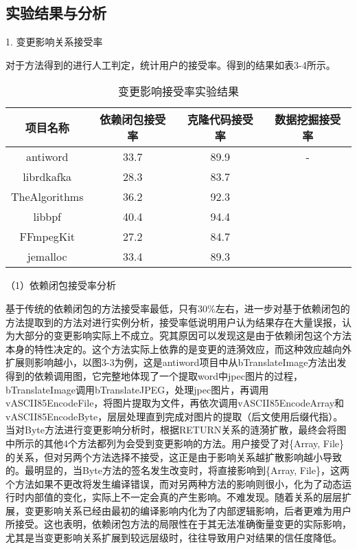 \subsection{实验结果与分析}


1. 变更影响关系接受率

对于方法得到的进行人工判定，统计用户的接受率。得到的结果如表3-4所示。

\begin{table}[htbp]
\caption{变更影响接受率实验结果}
\vspace{0.5em}\centering\wuhao
\begin{tabular}{cccc}
\toprule
项目名称 & 依赖闭包接受率 & 克隆代码接受率 & 数据挖掘接受率 \\
\midrule
antiword & 33.7 & 89.9 & - \\
librdkafka & 28.3 & 83.7 &  \\
TheAlgorithms & 36.2 & 92.3 &  \\
libbpf & 40.4 & 94.4 &  \\
FFmpegKit & 27.2 & 84.7 &  \\
jemalloc & 33.4 & 89.3 &  \\
\bottomrule
\end{tabular}
\end{table}

（1）依赖闭包接受率分析

基于传统的依赖闭包的方法接受率最低，只有30\%左右，进一步对基于依赖闭包的方法提取到的方法对进行实例分析，接受率低说明用户认为结果存在大量误报，认为大部分的变更影响实际上不成立。究其原因可以发现这是由于依赖闭包这个方法本身的特性决定的。这个方法实际上依靠的是变更的涟漪效应，而这种效应越向外扩展则影响越小，以图3-3为例，这是antiword项目中从bTranslateImage方法出发得到的依赖调用图，它完整地体现了一个提取word中jpec图片的过程，bTranslateImage调用bTranslateJPEG，处理jpec图片，再调用vASCII85EncodeFile，将图片提取为文件，再依次调用vASCII85EncodeArray和vASCII85EncodeByte，层层处理直到完成对图片的提取（后文使用后缀代指）。当对Byte方法进行变更影响分析时，根据RETURN关系的涟漪扩散，最终会将图中所示的其他4个方法都列为会受到变更影响的方法。用户接受了对\{Array, File\}的关系，但对另两个方法选择不接受，这正是由于影响关系越扩散影响越小导致的。最明显的，当Byte方法的签名发生改变时，将直接影响到\{Array, File\}，这两个方法如果不更改将发生编译错误，而对另两种方法的影响则很小，化为了动态运行时内部值的变化，实际上不一定会真的产生影响。不难发现。随着关系的层层扩展，变更影响关系已经由最初的编译影响内化为了内部逻辑影响，后者更难为用户所接受。这也表明，依赖闭包方法的局限性在于其无法准确衡量变更的实际影响，尤其是当变更影响关系扩展到较远层级时，往往导致用户对结果的信任度降低。


